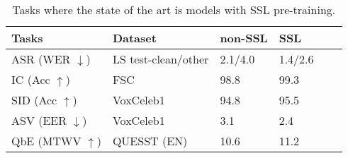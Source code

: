 \begin{table}[ht]
  \centering
  \footnotesize
  \caption{Tasks where the state of the art is models with SSL pre-training.}
  \label{table:sota_performance}
  \renewcommand*\arraystretch{1.2}
  \begin{tabular}{llllll}  
    \toprule
    Tasks & Dataset & non-SSL & SSL \\
    \midrule
    ASR (WER $\downarrow$) & LS test-clean/other & 2.1/4.0 \cite{xu_iterative_2020} & 1.4/2.6 \cite{zhang2020pushing} \\ \hline
    IC (Acc $\uparrow$) & FSC & 98.8 \cite{lugosch19_interspeech} & 99.3\cite{chen2021unispeechsat} \\ \hline
    SID (Acc $\uparrow$) & VoxCeleb1 & 94.8 \cite{hajibabaei2018unified} & 95.5 \cite{chen_wavlm_2021} \\ \hline
    ASV (EER $\downarrow$) & VoxCeleb1 & 3.1 \cite{hajavi2021siamese} & 2.4 \cite{wang2021fine} \\ \hline
    QbE (MTWV $\uparrow$) & QUESST (EN) & 10.6 \cite{rodriguez2014gtts} & 11.2\cite{chen2021unispeechsat} \\


    \bottomrule
  \end{tabular}
\end{table}

